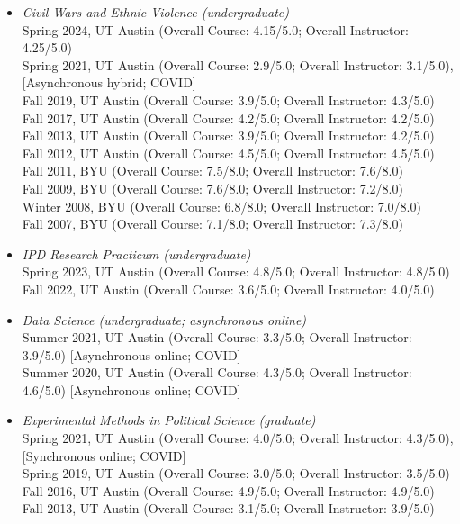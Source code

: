 \documentclass[10pt]{article}
\begin{document}
\begin{itemize}
\item \textit{Civil Wars and Ethnic Violence (undergraduate)}
\\ \indent Spring 2024, UT Austin (Overall Course: 4.15/5.0; Overall Instructor: 4.25/5.0)
\\ \indent Spring 2021, UT Austin (Overall Course: 2.9/5.0; Overall Instructor: 3.1/5.0), [Asynchronous hybrid; COVID]
\\ \indent Fall 2019, UT Austin (Overall Course: 3.9/5.0; Overall Instructor: 4.3/5.0)
\\ \indent Fall 2017, UT Austin (Overall Course: 4.2/5.0; Overall Instructor: 4.2/5.0)
\\ \indent Fall 2013, UT Austin (Overall Course: 3.9/5.0; Overall Instructor: 4.2/5.0)
\\ \indent Fall 2012, UT Austin (Overall Course: 4.5/5.0; Overall Instructor: 4.5/5.0)
\\ \indent Fall 2011, BYU (Overall Course: 7.5/8.0; Overall Instructor: 7.6/8.0)
\\ \indent Fall 2009, BYU (Overall Course: 7.6/8.0; Overall Instructor: 7.2/8.0)
\\ \indent Winter 2008, BYU (Overall Course: 6.8/8.0; Overall Instructor: 7.0/8.0)
\\ \indent Fall 2007, BYU (Overall Course: 7.1/8.0; Overall Instructor: 7.3/8.0) 

\item \textit{IPD Research Practicum (undergraduate)}
\\ \indent Spring 2023, UT Austin (Overall Course: 4.8/5.0; Overall Instructor: 4.8/5.0) 
\\ \indent Fall 2022, UT Austin (Overall Course: 3.6/5.0; Overall Instructor: 4.0/5.0) 

\item \textit{Data Science (undergraduate; asynchronous online)}
\\ \indent Summer 2021, UT Austin (Overall Course: 3.3/5.0; Overall Instructor: 3.9/5.0) [Asynchronous online; COVID]
\\ \indent Summer 2020, UT Austin (Overall Course: 4.3/5.0; Overall Instructor: 4.6/5.0) [Asynchronous online; COVID]

\item \textit{Experimental Methods in Political Science (graduate)}
\\ \indent Spring 2021, UT Austin (Overall Course: 4.0/5.0; Overall Instructor: 4.3/5.0), [Synchronous online; COVID]
\\ \indent Spring 2019, UT Austin (Overall Course: 3.0/5.0; Overall Instructor: 3.5/5.0) 
\\ \indent Fall 2016, UT Austin (Overall Course: 4.9/5.0; Overall Instructor: 4.9/5.0)
\\ \indent Fall 2013, UT Austin (Overall Course: 3.1/5.0; Overall Instructor: 3.9/5.0)


\end{itemize}
\end{document}
